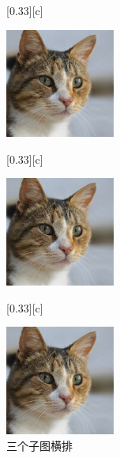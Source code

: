 \documentclass[12pt,a4paper,UTF8]{article}
\begin{document}
    \begin{figure}[!htbp]
        \centering
        [0.33\textwidth][c]{
            \centering
            \includegraphics[width=0.32\textwidth]{example}
             
        }%
            [0.33\textwidth][c]{
            \centering
            \includegraphics[width=0.32\textwidth]{example}
             
        }%
            [0.33\textwidth][c]{
            \centering
            \includegraphics[width=0.32\textwidth]{example}
             
        }%
        \caption{三个子图横排}
         
    \end{figure}
\end{document}
